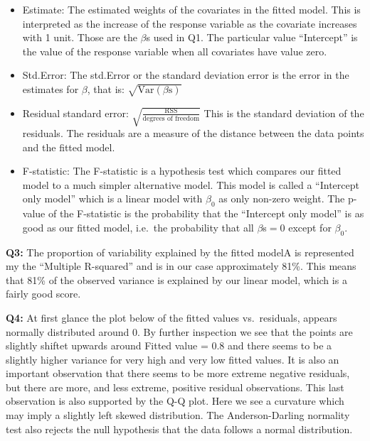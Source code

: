 \documentclass[]{article}
\begin{document}
\begin{itemize}
\item
  Estimate: The estimated weights of the covariates in the fitted model.
  This is interpreted as the increase of the response variable as the
  covariate increases with 1 unit. Those are the \(\beta\)s used in Q1.
  The particular value ``Intercept'' is the value of the response
  variable when all covariates have value zero.
\item
  Std.Error: The std.Error or the standard deviation error is the error
  in the estimates for \(\beta\), that is:
  \(\sqrt{\textrm{Var}(\beta\textrm{s})}\)
\item
  Residual standard error:
  \(\sqrt{\frac{\textrm{RSS}}{\textrm{degrees of freedom}}}\) This is
  the standard deviation of the residuals. The residuals are a measure
  of the distance between the data points and the fitted model.
\item
  F-statistic: The F-statistic is a hypothesis test which compares our
  fitted model to a much simpler alternative model. This model is called
  a ``Intercept only model'' which is a linear model with \(\beta_0\) as
  only non-zero weight. The p-value of the F-statistic is the
  probability that the ``Intercept only model'' is as good as our fitted
  model, i.e.~the probability that all \(\beta\)s\(=0\) except for
  \(\beta_0\).
\end{itemize}

\textbf{Q3:} The proportion of variability explained by the fitted
modelA is represented my the ``Multiple R-squared'' and is in our case
approximately 81\%. This means that 81\% of the observed variance is
explained by our linear model, which is a fairly good score.

\textbf{Q4:} At first glance the plot below of the fitted values
vs.~residuals, appears normally distributed around 0. By further
inspection we see that the points are slightly shiftet upwards around
Fitted value = 0.8 and there seems to be a slightly higher variance for
very high and very low fitted values. It is also an important
observation that there seems to be more extreme negative residuals, but
there are more, and less extreme, positive residual observations. This
last observation is also supported by the Q-Q plot. Here we see a
curvature which may imply a slightly left skewed distribution. The
Anderson-Darling normality test also rejects the null hypothesis that
the data follows a normal distribution.
\end{document}

